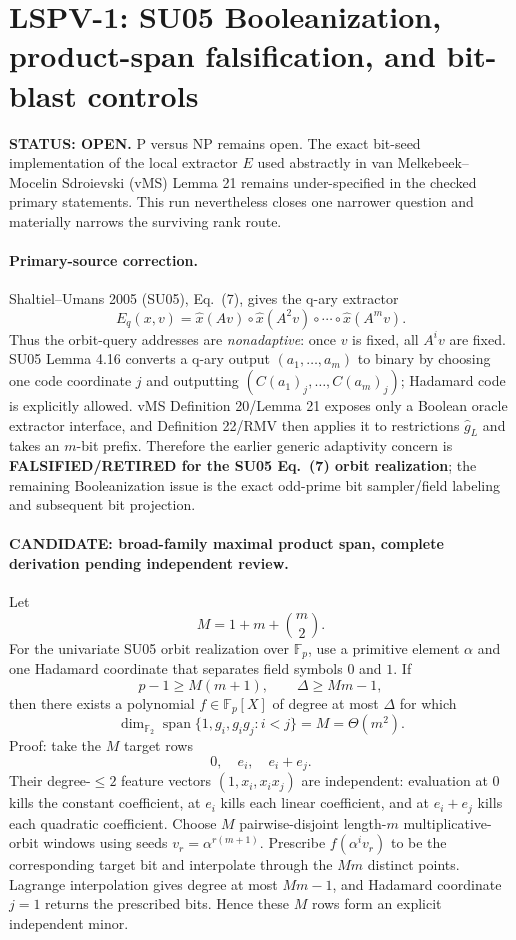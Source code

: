 \documentclass[11pt]{article}
\begin{document}
\section*{LSPV-1: SU05 Booleanization, product-span falsification, and bit-blast controls}

\textbf{STATUS: OPEN.} P versus NP remains open. The exact bit-seed implementation of the local extractor $E$ used abstractly in van Melkebeek--Mocelin Sdroievski (vMS) Lemma 21 remains under-specified in the checked primary statements. This run nevertheless closes one narrower question and materially narrows the surviving rank route.

\paragraph{Primary-source correction.}
Shaltiel--Umans 2005 (SU05), Eq.~(7), gives the q-ary extractor
\[
 E_q(x,v)=\widehat x(A v)\circ\widehat x(A^2v)\circ\cdots\circ\widehat x(A^m v).
\]
Thus the orbit-query addresses are \emph{nonadaptive}: once $v$ is fixed, all $A^iv$ are fixed. SU05 Lemma 4.16 converts a q-ary output $(a_1,\ldots,a_m)$ to binary by choosing one code coordinate $j$ and outputting $(C(a_1)_j,\ldots,C(a_m)_j)$; Hadamard code is explicitly allowed. vMS Definition 20/Lemma 21 exposes only a Boolean oracle extractor interface, and Definition 22/RMV then applies it to restrictions $\widehat g_L$ and takes an $m$-bit prefix. Therefore the earlier generic adaptivity concern is \textbf{FALSIFIED/RETIRED for the SU05 Eq.~(7) orbit realization}; the remaining Booleanization issue is the exact odd-prime bit sampler/field labeling and subsequent bit projection.

\paragraph{CANDIDATE: broad-family maximal product span, complete derivation pending independent review.}
Let
\[
 M=1+m+\binom m2.
\]
For the univariate SU05 orbit realization over $\mathbb F_p$, use a primitive element $\alpha$ and one Hadamard coordinate that separates field symbols $0$ and $1$. If
\[
 p-1\ge M(m+1),\qquad \Delta\ge Mm-1,
\]
then there exists a polynomial $f\in\mathbb F_p[X]$ of degree at most $\Delta$ for which
\[
 \dim_{\mathbb F_2}\operatorname{span}\{1,g_i,g_ig_j:i<j\}=M=\Theta(m^2).
\]
Proof: take the $M$ target rows
\[
 0,\quad e_i,\quad e_i+e_j.
\]
Their degree-$\le2$ feature vectors $(1,x_i,x_ix_j)$ are independent: evaluation at $0$ kills the constant coefficient, at $e_i$ kills each linear coefficient, and at $e_i+e_j$ kills each quadratic coefficient. Choose $M$ pairwise-disjoint length-$m$ multiplicative-orbit windows using seeds $v_r=\alpha^{r(m+1)}$. Prescribe $f(\alpha^iv_r)$ to be the corresponding target bit and interpolate through the $Mm$ distinct points. Lagrange interpolation gives degree at most $Mm-1$, and Hadamard coordinate $j=1$ returns the prescribed bits. Hence these $M$ rows form an explicit independent minor.
\end{document}
